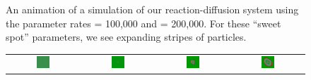 \begin{figure}[h]
\begin{tabular}{c c c c}
\end{tabular}
\caption{An animation of a simulation of our reaction-diffusion system using the parameter rates  = 100,000 and  = 200,000. For these ``sweet spot'' parameters, we see expanding stripes of  particles.}
\label{fig:k=200000_f=100000}
\end{figure}

\begin{figure}[h]
\centering
\mySfFamily
\begin{tabular}{c c c c}
\includegraphics[width = 0.19\textwidth]{../images/predator_prey_11_by_11_f_1.4_k_2.png} & \includegraphics[width = 0.19\textwidth]{../images/../images/predator_prey_11_by_11_f_1.4_k_2_i1.png} & \includegraphics[width = 0.19\textwidth]{../images/../images/predator_prey_11_by_11_f_1.4_k_2_i2.png} & \includegraphics[width = 0.19\textwidth]{../images/../images/predator_prey_11_by_11_f_1.4_k_2_i3.png}\\[2ex]

\end{tabular}
\end{figure}
